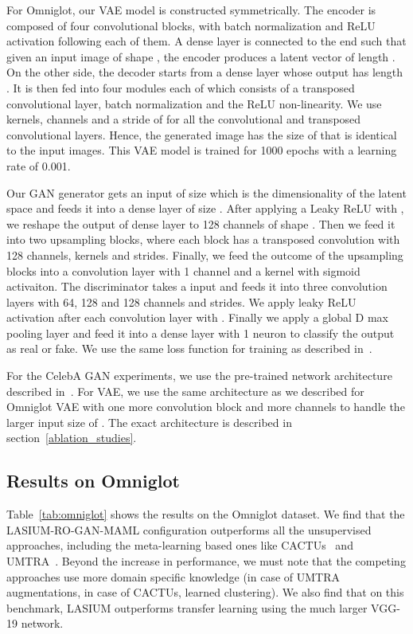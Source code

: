 \documentclass{article}
\begin{document}
For Omniglot, our VAE model is constructed symmetrically. The encoder is composed of four convolutional blocks, with batch normalization and ReLU activation following each of them. A dense layer is connected to the end such that given an input image of shape , the encoder produces a latent vector of length . On the other side, the decoder starts from a dense layer whose output has length . It is then fed into four modules each of which consists of a transposed convolutional layer, batch normalization and the ReLU non-linearity. We use  kernels,  channels and a stride of  for all the convolutional and transposed convolutional layers. Hence, the generated image has the size of  that is identical to the input images. This VAE model is trained for 1000 epochs with a learning rate of 0.001. 


Our GAN generator gets an input of size  which is the dimensionality of the latent space and feeds it into a dense layer of size . After applying a Leaky ReLU with , we reshape the output of dense layer to 128 channels of shape . Then we feed it into two upsampling blocks, where each block has a transposed convolution with 128 channels,  kernels and  strides. Finally, we feed the outcome of the upsampling blocks into a convolution layer with 1 channel and a  kernel with sigmoid activaiton. The discriminator takes a  input and feeds it into three  convolution layers with 64, 128 and 128 channels and  strides. We apply leaky ReLU activation after each convolution layer with . Finally we apply a global D max pooling layer and feed it into a dense layer with 1 neuron to classify the output as real or fake. 
We use the same loss function for training  as described in~\cite{mode-gan-Qi2019}.

For the CelebA GAN experiments, we use the pre-trained network architecture described in~\cite{karras2017progressive}. For VAE, we use the same architecture as we described for Omniglot VAE with one more convolution block and more channels to handle the larger input size of . The exact architecture is described in section~\ref{ablation_studies}.

\subsection{Results on Omniglot}
Table~\ref{tab:omniglot} shows the results on the Omniglot dataset. We find that the LASIUM-RO-GAN-MAML configuration outperforms all the unsupervised approaches, including the meta-learning based ones like CACTUs~\cite{hsu2018unsupervised} and UMTRA~\cite{khodadadeh2019unsupervised}. Beyond the increase in performance, we must note that the competing approaches use more domain specific knowledge (in case of UMTRA augmentations, in case of CACTUs, learned clustering). We also find that on this benchmark, LASIUM outperforms transfer learning using the much larger VGG-19 network. 
\end{document}

